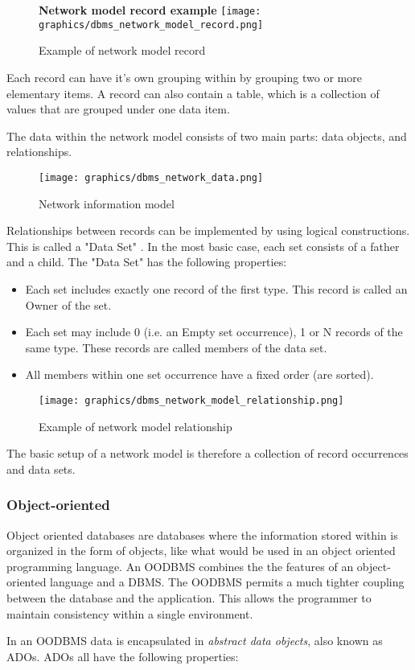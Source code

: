 \documentclass[letterpaper, 12pt]{article}
\begin{document}
\begin{figure}
  \centering
  \textbf{Network model record example}
  \texttt{[image: graphics/dbms\_network\_model\_record.png]}
  \caption{Example of network model record}
  \cite{network_model_coronet}
\end{figure}

Each record can have it's own grouping within by grouping two or more elementary items.
A record can also contain a table, which is a collection of values that are grouped 
under one data item. 
\par\vspace{\baselineskip}
The data within the network model consists of two main parts: data objects, and
relationships.
 
\begin{figure}
  \centering
  \texttt{[image: graphics/dbms\_network\_data.png]}
  \caption{Network information model}
  \cite{network_model_coronet}
\end{figure}

Relationships between records can be implemented by using logical constructions. 
This is called a "Data Set" . In the most basic case, each set consists of a father 
and a child. The "Data Set" has the following properties: 

\begin{itemize}
  \item Each set includes exactly one record of the first type. This record is called an Owner of the set.
  \item Each set may include 0 (i.e. an Empty set occurrence), 1 or N records of the same type. These records are called members of the data set.
  \item All members within one set occurrence have a fixed order (are sorted).
\end{itemize}

\begin{figure}
  \centering
  \texttt{[image: graphics/dbms\_network\_model\_relationship.png]}
  \caption{Example of network model relationship}
\end{figure}

The basic setup of a network model is therefore a collection of record occurrences and
data sets. 

\subsubsection{Object-oriented}
Object oriented databases are databases where the information stored within is organized
in the form of objects, like what would be used in an object oriented programming
language. An OODBMS combines the the features of an object-oriented language and a
DBMS. The OODBMS permits a much tighter coupling between the database and the application. This allows the programmer to maintain consistency within a single environment. 
\par\vspace{\baselineskip}
In an OODBMS data is encapsulated in \textit{abstract data objects}, also known 
as ADOs. ADOs all have the following properties: 
\end{document}
